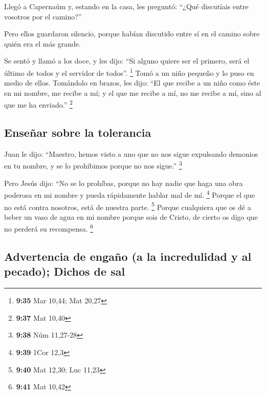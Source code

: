  Llegó a Capernaúm y, estando en la casa, les preguntó:
``¿Qué discutíais entre vosotros por el camino?''

 Pero ellos guardaron silencio, porque habían discutido
entre sí en el camino sobre quién era el más grande.

 Se sentó y llamó a los doce, y les dijo: ``Si alguno
quiere ser el primero, será el último de todos y el servidor de todos''.
\footnote{\textbf{9:35} Mar 10,44; Mat 20,27}  Tomó a un
niño pequeño y lo puso en medio de ellos. Tomándolo en brazos, les dijo:
 ``El que recibe a un niño como éste en mi nombre, me
recibe a mí; y el que me recibe a mí, no me recibe a mí, sino al que me
ha enviado.'' \footnote{\textbf{9:37} Mat 10,40}

\hypertarget{enseuxf1ar-sobre-la-tolerancia}{%
\subsection{Enseñar sobre la
tolerancia}\label{enseuxf1ar-sobre-la-tolerancia}}

 Juan le dijo: ``Maestro, hemos visto a uno que no nos
sigue expulsando demonios en tu nombre, y se lo prohibimos porque no nos
sigue.'' \footnote{\textbf{9:38} Núm 11,27-28}

 Pero Jesús dijo: ``No se lo prohíbas, porque no hay
nadie que haga una obra poderosa en mi nombre y pueda rápidamente hablar
mal de mí. \footnote{\textbf{9:39} 1Cor 12,3}  Porque el
que no está contra nosotros, está de nuestra parte. \footnote{\textbf{9:40}
  Mat 12,30; Luc 11,23}  Porque cualquiera que os dé a
beber un vaso de agua en mi nombre porque sois de Cristo, de cierto os
digo que no perderá su recompensa. \footnote{\textbf{9:41} Mat 10,42}

\hypertarget{advertencia-de-engauxf1o-a-la-incredulidad-y-al-pecado-dichos-de-sal}{%
\subsection{Advertencia de engaño (a la incredulidad y al pecado);
Dichos de
sal}\label{advertencia-de-engauxf1o-a-la-incredulidad-y-al-pecado-dichos-de-sal}}

